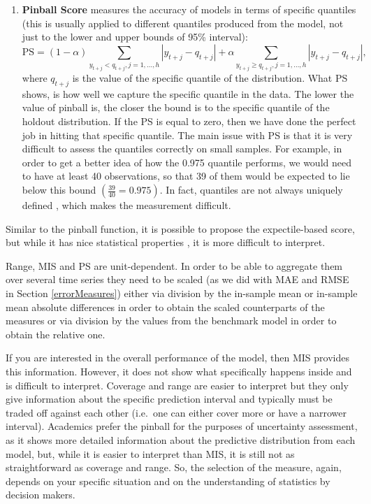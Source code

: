 \documentclass[
]{book}
\theoremstyle{definition}
\theoremstyle{definition}
\theoremstyle{definition}
\theoremstyle{definition}
\theoremstyle{remark}
\begin{document}
\begin{enumerate}
\item
  \textbf{Pinball Score} \citep{Koenker1978} measures the accuracy of models in terms of specific quantiles (this is usually applied to different quantiles produced from the model, not just to the lower and upper bounds of 95\% interval):
  \begin{equation}
   \mathrm{PS} = (1 -\alpha) \sum_{y_{t+j} < q_{t+j}, j=1,\dots,h } |y_{t+j} -q_{t+j}| + \alpha \sum_{y_{t+j} \geq q_{t+j} , j=1,\dots,h } |y_{t+j} -q_{t+j}|,
   \label{eq:pinball}
  \end{equation}
  where \(q_{t+j}\) is the value of the specific quantile of the distribution. What PS shows, is how well we capture the specific quantile in the data. The lower the value of pinball is, the closer the bound is to the specific quantile of the holdout distribution. If the PS is equal to zero, then we have done the perfect job in hitting that specific quantile. The main issue with PS is that it is very difficult to assess the quantiles correctly on small samples. For example, in order to get a better idea of how the 0.975 quantile performs, we would need to have at least 40 observations, so that 39 of them would be expected to lie below this bound \(\left(\frac{39}{40} = 0.975\right)\). In fact, quantiles are not always uniquely defined \citep[see, for example,][]{Taylor2020}, which makes the measurement difficult.
\end{enumerate}

Similar to the pinball function, it is possible to propose the expectile-based score, but while it has nice statistical properties \citep{Taylor2020}, it is more difficult to interpret.

Range, MIS and PS are unit-dependent. In order to be able to aggregate them over several time series they need to be scaled (as we did with MAE and RMSE in Section \ref{errorMeasures}) either via division by the in-sample mean or in-sample mean absolute differences in order to obtain the scaled counterparts of the measures or via division by the values from the benchmark model in order to obtain the relative one.

If you are interested in the overall performance of the model, then MIS provides this information. However, it does not show what specifically happens inside and is difficult to interpret. Coverage and range are easier to interpret but they only give information about the specific prediction interval and typically must be traded off against each other (i.e.~one can either cover more or have a narrower interval). Academics prefer the pinball for the purposes of uncertainty assessment, as it shows more detailed information about the predictive distribution from each model, but, while it is easier to interpret than MIS, it is still not as straightforward as coverage and range. So, the selection of the measure, again, depends on your specific situation and on the understanding of statistics by decision makers.
\end{document}
